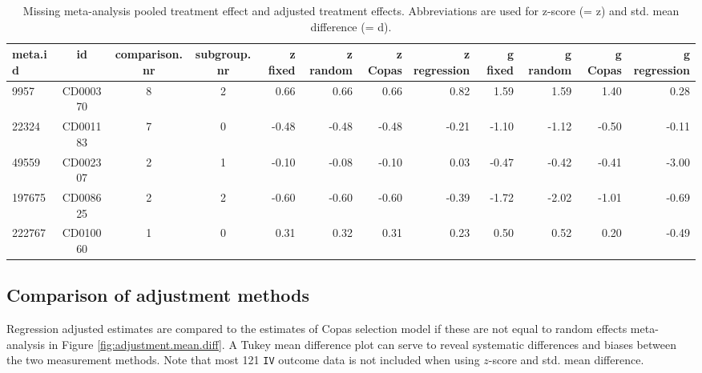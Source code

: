 \documentclass[11pt,a4paper,twoside]{book}\usepackage[]{graphicx}\usepackage[]{color}
\begin{document}
\begin{table}[ht]
\centering
\begingroup\tiny
\begin{tabular}{lcccrrrrrrrr}
  \hline
meta.id & id & comparison.nr & subgroup.nr & z fixed & z random & z Copas & z regression & g fixed & g random & g Copas & g regression \\ 
  \hline
9957 & CD000370 & 8 & 2 & 0.66 & 0.66 & 0.66 & 0.82 & 1.59 & 1.59 & 1.40 & 0.28 \\ 
  22324 & CD001183 & 7 & 0 & -0.48 & -0.48 & -0.48 & -0.21 & -1.10 & -1.12 & -0.50 & -0.11 \\ 
  49559 & CD002307 & 2 & 1 & -0.10 & -0.08 & -0.10 & 0.03 & -0.47 & -0.42 & -0.41 & -3.00 \\ 
  197675 & CD008625 & 2 & 2 & -0.60 & -0.60 & -0.60 & -0.39 & -1.72 & -2.02 & -1.01 & -0.69 \\ 
  222767 & CD010060 & 1 & 0 & 0.31 & 0.32 & 0.31 & 0.23 & 0.50 & 0.52 & 0.20 & -0.49 \\ 
   \hline
\end{tabular}
\endgroup
\caption{Missing meta-analysis pooled treatment effect and adjusted treatment effects. Abbreviations are used for z-score (= z) and std. mean difference (= d).} 
\label{missing.differences}
\end{table}



\subsection{Comparison of adjustment methods}
Regression adjusted estimates are compared to the estimates of Copas selection model if these are not equal to random effects meta-analysis in Figure \ref{fig:adjustment.mean.diff}. A Tukey mean difference plot can serve to reveal systematic differences and biases between the two measurement methods. Note that most 121 \texttt{IV} outcome data is not included when using $z$-score and std. mean difference.
\end{document}

